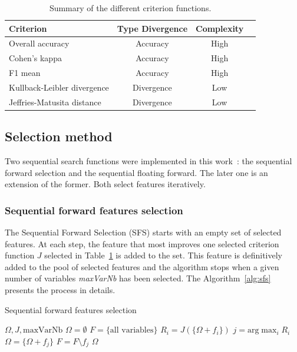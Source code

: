\documentclass[journal,peerreview,onecolumn]{IEEEtran}
\begin{document}
        \begin{table}[!t]
            \centering
            \caption{Summary of the different criterion functions.\label{tab:crit}}
            \begin{tabular}[b]{lccc}
              \toprule
              Criterion & Type Divergence & Complexity \\
              \midrule
              Overall accuracy            & Accuracy   & High \\
              Cohen's kappa               & Accuracy   & High\\
              F1 mean                     & Accuracy   & High\\
              \midrule
              Kullback-Leibler divergence & Divergence & Low \\
              Jeffries-Matusita distance  & Divergence & Low \\
              \bottomrule
            \end{tabular}
        \end{table}

        \subsection{Selection method}
        \label{sec:selection:method}
        Two  sequential  search  functions were  implemented  in  this
        work~\cite{Guyon:2006:FEF:1208773}:  the   sequential  forward
        selection and the sequential  floating forward.  The later one
        is  an   extension  of   the  former.  Both   select  features
        iteratively.
        
        \subsubsection{Sequential forward features selection}
        \label{sec:forward-presentation}

        The Sequential Forward Selection (SFS) starts with an empty set of selected features.  At each  step, the feature that most  improves one selected criterion function $J$ selected in Table~\ref{tab:crit} is added  to the set. This feature is definitively added to the pool of selected features and the algorithm stops when a given number of variables \emph{maxVarNb} has been selected. The Algorithm~\ref{alg:sfs} presents the process in details.

        \begin{algorithm}
        \caption{Sequential forward features selection\label{alg:sfs}}
        {\footnotesize
        \begin{algorithmic}[1]
        \REQUIRE $\Omega,J,\text{maxVarNb}$
        \STATE $\Omega=\emptyset$
        \STATE $F=\text{\{all variables\}}$
        \STATE $R_i = J(\{\Omega + f_i\})$
        \ENDFOR
        \STATE $j=\text{arg} \max_{i} R_i$
        \STATE $\Omega = \{\Omega + f_j\}$
        \STATE $F = F \setminus f_j$
        \ENDWHILE
        \RETURN $\Omega$
        \end{algorithmic}
        }
        \end{algorithm}
\end{document}
